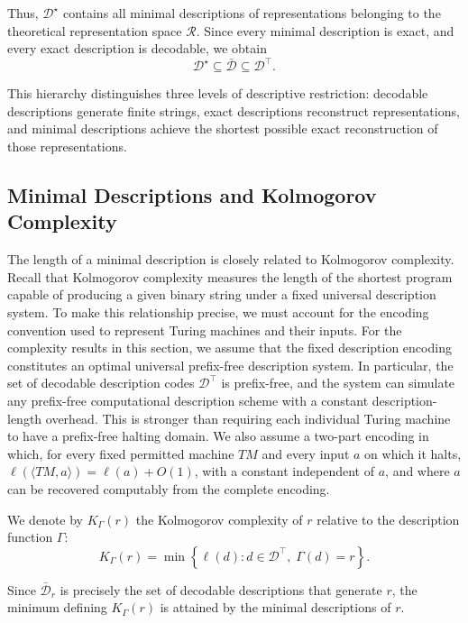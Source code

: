 Thus, $\mathcal{D}^\star$ contains all minimal descriptions of representations belonging to the theoretical representation space $\mathcal{R}$. Since every minimal description is exact, and every exact description is decodable, we obtain
\[
\mathcal{D}^\star \subseteq \bar{\mathcal{D}} \subseteq \mathcal{D}^\top.
\]

This hierarchy distinguishes three levels of descriptive restriction: decodable descriptions generate finite strings, exact descriptions reconstruct representations, and minimal descriptions achieve the shortest possible exact reconstruction of those representations.


\subsection*{Minimal Descriptions and Kolmogorov Complexity}

The length of a minimal description is closely related to Kolmogorov complexity. Recall that Kolmogorov complexity measures the length of the shortest program capable of producing a given binary string under a fixed universal description system. To make this relationship precise, we must account for the encoding convention used to represent Turing machines and their inputs. For the complexity results in this section, we assume that the fixed description encoding constitutes an optimal universal prefix-free description system. In particular, the set of decodable description codes $\mathcal{D}^\top$ is prefix-free, and the system can simulate any prefix-free computational description scheme with a constant description-length overhead. This is stronger than requiring each individual Turing machine to have a prefix-free halting domain. We also assume a two-part encoding in which, for every fixed permitted machine $TM$ and every input $a$ on which it halts, $\ell(\langle TM,a\rangle)=\ell(a)+O(1)$, with a constant independent of $a$, and where $a$ can be recovered computably from the complete encoding.

\begin{notation}
We denote by $K_\Gamma(r)$ the Kolmogorov complexity of $r$ relative to the description function $\Gamma$:
\[
K_\Gamma(r) = \min \left\{ \ell(d): d\in\mathcal{D}^\top,\; \Gamma(d)=r \right\}.
\]
\end{notation}

Since $\bar{\mathcal{D}}_r$ is precisely the set of decodable descriptions that generate $r$, the minimum defining $K_\Gamma(r)$ is attained by the minimal descriptions of $r$.

